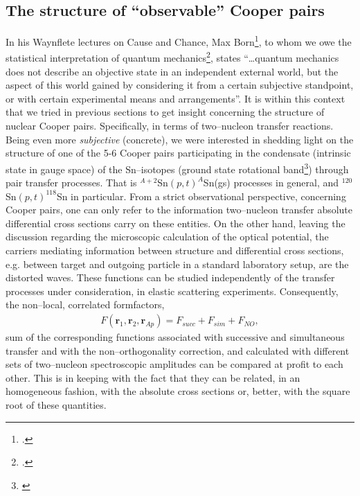 \subsection{The structure of ``observable'' Cooper pairs}\label{S6.5.4}
In his Waynflete lectures on Cause and Chance, Max Born\footnote{\cite{Born:48}.}, to whom we owe the statistical interpretation of quantum mechanics\footnote{\cite{Born:64,Pais:86}.}, states ``\dots quantum mechanics does not describe an objective state in an independent external world, but the aspect of this world gained by considering it from a certain subjective standpoint, or with certain experimental means and arrangements''. It is within this context that we tried in previous sections to get insight concerning the structure of nuclear Cooper pairs. Specifically, in terms of two--nucleon transfer reactions. Being even more \textit{subjective} (concrete), we were interested in shedding light on the structure of one of the 5-6 Cooper pairs participating in the condensate (intrinsic state in gauge space) of the Sn--isotopes (ground state rotational band\footnote{\cite{Potel:13b,Potel:17}}) through pair transfer processes. That is $^{A+2}$Sn$(p,t)^{A}$Sn(gs) processes in general, and $^{120}$Sn$(p,t)^{118}$Sn in particular. From a strict observational perspective, concerning Cooper pairs, one can only refer to the information two--nucleon transfer absolute differential cross sections carry on these entities. On the other hand, leaving the discussion regarding the microscopic calculation of the optical potential, the carriers mediating information between structure and differential cross sections, e.g. between target and outgoing particle in a standard laboratory setup, are the distorted waves. These functions can be studied independently of the transfer processes under consideration, in elastic scattering experiments. Consequently, the non--local, correlated formfactors,
\begin{align}\label{eq6.6.1}
F(\mathbf r_1,\mathbf r_2,\mathbf r_{Ap})=F_{succ}+F_{sim}+F_{NO},
\end{align}
sum of the corresponding functions associated with successive and simultaneous transfer  and with the non--orthogonality correction, and calculated with different sets of two--nucleon spectroscopic amplitudes can be compared at profit to each other. This is in keeping with the fact that they can be related, in an homogeneous fashion, with the absolute cross sections or, better, with the square root of these quantities. 

